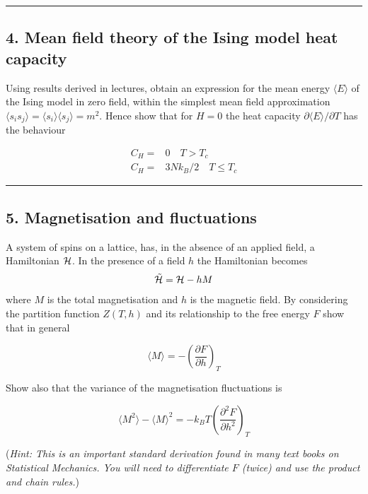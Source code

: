 \documentclass[
  letterpaper,
  DIV=11,
  numbers=noendperiod]{scrreprt}
\begin{document}
\begin{center}\rule{0.5\linewidth}{0.5pt}\end{center}

\subsection*{4. Mean field theory of the Ising model heat
capacity}\label{mean-field-theory-of-the-ising-model-heat-capacity}

Using results derived in lectures, obtain an expression for the mean
energy \(\langle E\rangle\) of the Ising model in zero field, within the
simplest mean field approximation \(\langle
  s_is_j\rangle=\langle s_i\rangle\langle s_j\rangle=m^2\). Hence show
that for \(H=0\) the heat capacity
\(\partial \langle E\rangle/\partial T\) has the behaviour

\begin{align*}
C_H=& 0 \quad T>T_c\\
C_H=& 3Nk_B/2 \quad T\le T_c
\end{align*}

\begin{center}\rule{0.5\linewidth}{0.5pt}\end{center}

\subsection*{5. Magnetisation and
fluctuations}\label{magnetisation-and-fluctuations}

A system of spins on a lattice, has, in the absence of an applied field,
a Hamiltonian \({\cal H}\). In the presence of a field \(h\) the
Hamiltonian becomes \[
\tilde {\cal H}={\cal H}-hM
\] where \(M\) is the total magnetisation and \(h\) is the magnetic
field. By considering the partition function \(Z(T,h)\) and its
relationship to the free energy \(F\) show that in general

\[
\langle M \rangle=-\left(\frac{\partial F}{\partial h}\right)_T
\]

Show also that the variance of the magnetisation fluctuations is

\[\langle M^2\rangle-\langle M\rangle^2=-k_BT\left(\frac{\partial^2 F}{\partial h^2}\right)_T\]

(\emph{Hint: This is an important standard derivation found in many text
books on Statistical Mechanics. You will need to differentiate \(F\)
(twice) and use the product and chain rules.})
\end{document}
